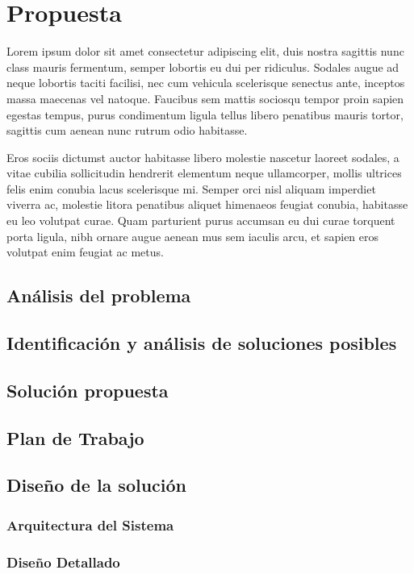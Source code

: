 \documentclass{article}
\begin{document}
\newpage

\section{Propuesta}
Lorem ipsum dolor sit amet consectetur adipiscing elit, duis nostra sagittis nunc class mauris fermentum, semper lobortis eu dui per ridiculus. Sodales augue ad neque lobortis taciti facilisi, nec cum vehicula scelerisque senectus ante, inceptos massa maecenas vel natoque. Faucibus sem mattis sociosqu tempor proin sapien egestas tempus, purus condimentum ligula tellus libero penatibus mauris tortor, sagittis cum aenean nunc rutrum odio habitasse.

Eros sociis dictumst auctor habitasse libero molestie nascetur laoreet sodales, a vitae cubilia sollicitudin hendrerit elementum neque ullamcorper, mollis ultrices felis enim conubia lacus scelerisque mi. Semper orci nisl aliquam imperdiet viverra ac, molestie litora penatibus aliquet himenaeos feugiat conubia, habitasse eu leo volutpat curae. Quam parturient purus accumsan eu dui curae torquent porta ligula, nibh ornare augue aenean mus sem iaculis arcu, et sapien eros volutpat enim feugiat ac metus.

\subsection{Análisis del problema}
\subsection{Identificación y análisis de soluciones posibles}
\subsection{Solución propuesta}
\subsection{Plan de Trabajo}
\subsection{Diseño de la solución}
\subsubsection{Arquitectura del Sistema}
\subsubsection{Diseño Detallado}
\end{document}
